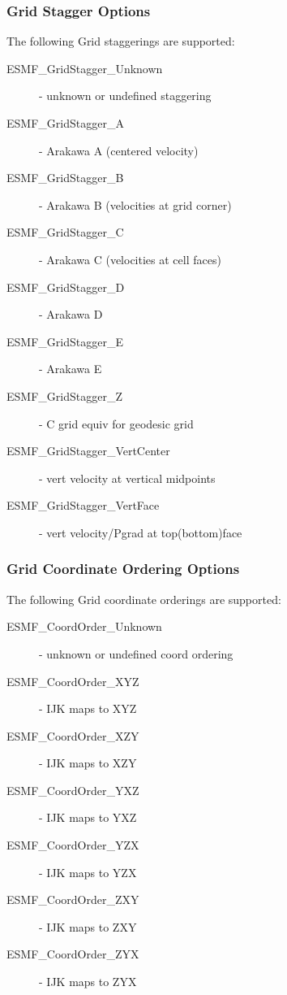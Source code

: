 \subsubsection{Grid Stagger Options}
The following Grid staggerings are supported:
\begin{description}
   \item[ESMF\_GridStagger\_Unknown] - unknown or undefined staggering
   \item[ESMF\_GridStagger\_A] - Arakawa A (centered velocity)
   \item[ESMF\_GridStagger\_B] - Arakawa B (velocities at grid corner)
   \item[ESMF\_GridStagger\_C] - Arakawa C (velocities at cell faces)
   \item[ESMF\_GridStagger\_D] - Arakawa D
   \item[ESMF\_GridStagger\_E] - Arakawa E
   \item[ESMF\_GridStagger\_Z] - C grid equiv for geodesic grid
   \item[ESMF\_GridStagger\_VertCenter] - vert velocity at vertical midpoints
   \item[ESMF\_GridStagger\_VertFace] - vert velocity/Pgrad at top(bottom)face
\end{description}


\subsubsection{Grid Coordinate Ordering Options}
The following Grid coordinate orderings are supported:
\begin{description}
   \item[ESMF\_CoordOrder\_Unknown] - unknown or undefined coord ordering
   \item[ESMF\_CoordOrder\_XYZ] - IJK maps to XYZ
   \item[ESMF\_CoordOrder\_XZY] - IJK maps to XZY
   \item[ESMF\_CoordOrder\_YXZ] - IJK maps to YXZ
   \item[ESMF\_CoordOrder\_YZX] - IJK maps to YZX
   \item[ESMF\_CoordOrder\_ZXY] - IJK maps to ZXY
   \item[ESMF\_CoordOrder\_ZYX] - IJK maps to ZYX
\end{description}

